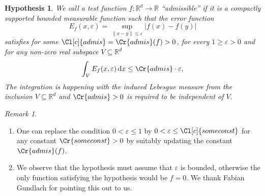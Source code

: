 \documentclass{amsart}
\newtheorem{hypothesis}[theorem]{Hypothesis}
\theoremstyle{definition}
\theoremstyle{remark}
\newtheorem{remark}[theorem]{Remark}
\newcommand{\diff}{\,\mathrm{d}}
\begin{document}
\begin{hypothesis} We call a test function
    $f: \mathbb{R}^{d} \rightarrow \mathbb{R}$ 
    ``admissible'' if it is a 
    compactly supported bounded measurable function such that 
    the error function 
    \begin{equation}
        E_{f}(x, \varepsilon) = \sup_{\|x-y\| \leq \varepsilon} |f(x)-f(y)|
        \label{eq:defi_of_E}
    \end{equation}
    satisfies for some $\Cl[c]{admis} = \Cr{admis}(f)>0$, for every $1 \geq \varepsilon>0$ 
    and for any non-zero real subspace $V \subseteq \mathbb{R}^{d}$
    \begin{equation}
        \int_{V} E_{f}(x,\varepsilon) \diff x \leq \Cr{admis} \cdot \varepsilon,
    \end{equation}
    The integration is happening with the induced Lebesgue 
    measure from the inclusion $V \subseteq \mathbb{R}^{d}$ and $\Cr{admis}>0$ is required to be independent of $V$. 
    \label{hy:admissible}
\end{hypothesis}
\begin{remark}
    \label{re:help}
    \begin{enumerate}

        \ 


        \item One can replace the condition $0 < \varepsilon \leq 1$ by $0 < \varepsilon \leq \Cl[c]{someconst}$ for any constant $\Cr{someconst}>0$ by suitably updating the constant $\Cr{admis}(f)$. 
        \item 
            We observe that the hypothesis must assume that $\varepsilon$ is bounded, otherwise the only function satisfying the hypothesis would be $f=0$. 
            We thank Fabian Gundlach for pointing this out to us.
    \end{enumerate}
\end{remark}
\end{document}
